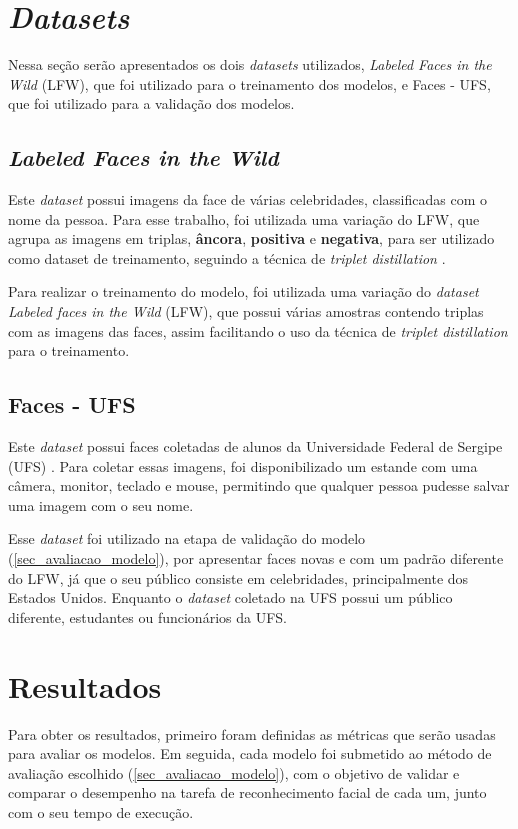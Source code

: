 \section{\textit{Datasets}}\label{sec_datasets}
Nessa seção serão apresentados os dois \textit{datasets} utilizados, \textit{Labeled Faces in the Wild} (LFW),
que foi utilizado para o treinamento dos modelos, e Faces - UFS, que foi utilizado para a validação dos modelos.

\subsection{\textit{Labeled Faces in the Wild}}
Este \textit{dataset} possui imagens da face de várias celebridades, classificadas com o nome da pessoa.
Para esse trabalho, foi utilizada uma variação do LFW, que agrupa as imagens em triplas, \textbf{âncora},
\textbf{positiva} e \textbf{negativa}, para ser utilizado como dataset de treinamento, seguindo a técnica
de \textit{triplet distillation} \cite{triplet_distillation_face_recognition}.


Para realizar o treinamento do modelo, foi utilizada uma variação do \textit{dataset}
\textit{Labeled faces in the Wild} (LFW), que possui várias amostras contendo triplas com as imagens das faces,
assim facilitando o uso da técnica de \textit{triplet distillation} para o treinamento.

\subsection{Faces - UFS}\label{subsec_dataset_faces_ufs}
Este \textit{dataset} possui faces coletadas de alunos da Universidade Federal de Sergipe (UFS) \cite{leandro}.
Para coletar essas imagens, foi disponibilizado um estande com uma câmera, monitor, teclado e mouse, permitindo
que qualquer pessoa pudesse salvar uma imagem com o seu nome.

Esse \textit{dataset} foi utilizado na etapa de validação do modelo (\ref{sec_avaliacao_modelo}), por apresentar faces
novas e com um padrão diferente do LFW, já que o seu público consiste em celebridades, principalmente dos Estados
Unidos. Enquanto o \textit{dataset} coletado na UFS possui um público diferente, estudantes ou funcionários da UFS.

\section{Resultados}\label{sec_resultados}
Para obter os resultados, primeiro foram definidas as métricas que serão usadas para avaliar os modelos. Em seguida,
cada modelo foi submetido ao método de avaliação escolhido (\autoref{sec_avaliacao_modelo}), com o objetivo de
validar e comparar o desempenho na tarefa de reconhecimento facial de cada um, junto com o seu tempo de execução.

